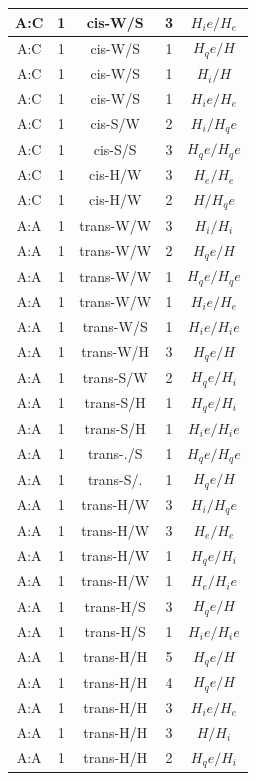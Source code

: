 \begin{center}
\begin{longtable}{c|c|c|c|c}
A:C & 1 & cis-W/S & 3 & $H_ie/H_e$ \\  \hline
A:C & 1 & cis-W/S & 1 & $H_qe/H$ \\  \hline
A:C & 1 & cis-W/S & 1 & $H_i/H$ \\  \hline
A:C & 1 & cis-W/S & 1 & $H_ie/H_e$ \\  \hline
A:C & 1 & cis-S/W & 2 & $H_i/H_qe$ \\  \hline
A:C & 1 & cis-S/S & 3 & $H_qe/H_qe$ \\  \hline
A:C & 1 & cis-H/W & 3 & $H_e/H_e$ \\  \hline
A:C & 1 & cis-H/W & 2 & $H/H_qe$ \\  \hline
A:A & 1 & trans-W/W & 3 & $H_i/H_i$ \\  \hline
A:A & 1 & trans-W/W & 2 & $H_qe/H$ \\  \hline
A:A & 1 & trans-W/W & 1 & $H_qe/H_qe$ \\  \hline
A:A & 1 & trans-W/W & 1 & $H_ie/H_e$ \\  \hline
A:A & 1 & trans-W/S & 1 & $H_ie/H_ie$ \\  \hline
A:A & 1 & trans-W/H & 3 & $H_qe/H$ \\  \hline
A:A & 1 & trans-S/W & 2 & $H_qe/H_i$ \\  \hline
A:A & 1 & trans-S/H & 1 & $H_qe/H_i$ \\  \hline
A:A & 1 & trans-S/H & 1 & $H_ie/H_ie$ \\  \hline
A:A & 1 & trans-./S & 1 & $H_qe/H_qe$ \\  \hline
A:A & 1 & trans-S/. & 1 & $H_qe/H$ \\  \hline
A:A & 1 & trans-H/W & 3 & $H_i/H_qe$ \\  \hline
A:A & 1 & trans-H/W & 3 & $H_e/H_e$ \\  \hline
A:A & 1 & trans-H/W & 1 & $H_qe/H_i$ \\  \hline
A:A & 1 & trans-H/W & 1 & $H_e/H_ie$ \\  \hline
A:A & 1 & trans-H/S & 3 & $H_qe/H$ \\  \hline
A:A & 1 & trans-H/S & 1 & $H_ie/H_ie$ \\  \hline
A:A & 1 & trans-H/H & 5 & $H_qe/H$ \\  \hline
A:A & 1 & trans-H/H & 4 & $H_qe/H$ \\  \hline
A:A & 1 & trans-H/H & 3 & $H_ie/H_e$ \\  \hline
A:A & 1 & trans-H/H & 3 & $H/H_i$ \\  \hline
A:A & 1 & trans-H/H & 2 & $H_qe/H_i$ \\  \hline

\end{longtable}
\end{center}
